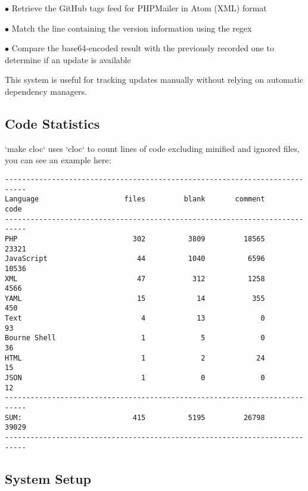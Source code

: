 \documentclass[a4paper]{article}
\begin{document}
\begin{compactitem}
\item[\color{myblue}$\bullet$] Retrieve the GitHub tags feed for PHPMailer in Atom (XML) format
\item[\color{myblue}$\bullet$] Match the line containing the version information using the regex
\item[\color{myblue}$\bullet$] Compare the base64-encoded result with the previously recorded one to determine if an update is available
\end{compactitem}

This system is useful for tracking updates manually without relying on automatic dependency managers.

\hypertarget{toc47}{}
\subsection{Code Statistics}

`make cloc` uses `cloc` to count lines of code excluding minified and ignored files, you can see an example here:

\begin{lstlisting}
---------------------------------------------------------------------------
Language                    files         blank       comment          code
---------------------------------------------------------------------------
PHP                           302          3809         18565         23321
JavaScript                     44          1040          6596         10536
XML                            47           312          1258          4566
YAML                           15            14           355           450
Text                            4            13             0            93
Bourne Shell                    1             5             0            36
HTML                            1             2            24            15
JSON                            1             0             0            12
---------------------------------------------------------------------------
SUM:                          415          5195         26798         39029
---------------------------------------------------------------------------
\end{lstlisting}

\hypertarget{toc48}{}
\subsection{System Setup}
\end{document}
